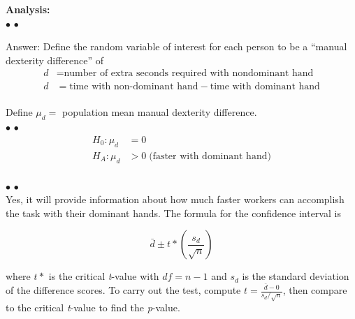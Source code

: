 \vspace{20pt}
\noindent \textbf{Analysis:}\\
\vspace{8pt}
\noindent $\bullet$  $\bullet$ \\
\vspace{5pt}

Answer: Define the random variable of interest for each person to be a ``manual dexterity difference'' of 
\begin{equation*}
\begin{split}
d &= \textrm{number of extra seconds required with nondominant hand} \\
d   &= \textrm{time with non-dominant hand} - \textrm{time with dominant hand}\\
\end{split}
\end{equation*}

Define $\mu_d =$ population mean manual dexterity difference.\\

\vspace{18pt}
\noindent $\bullet$  $\bullet$
\begin{equation*}
\begin{split}
H_0 : \mu_d &= 0\\
H_A: \mu_d &> 0  \; \textrm{(faster with dominant hand)}\\
\end{split}
\end{equation*}
 
 \vspace{5pt}
\noindent $\bullet$  $\bullet$ \\
\vspace{5pt}
Yes, it will provide information about how much faster workers can accomplish the task with their dominant hands. The formula for the confidence interval is 

\begin{equation*}
\bar{d} \pm t*\left(\frac{s_d}{\sqrt{n}}\right)
\end{equation*}
 
where $t*$ is the critical \textit{t}-value with $df = n-1$ and $s_d$ is the standard deviation of the difference scores. 
To carry out the test, compute $t=\frac{\bar{d}-0}{s_d/\sqrt{n}}$, then compare to the critical \textit{t}-value to find the \textit{p}-value. 

